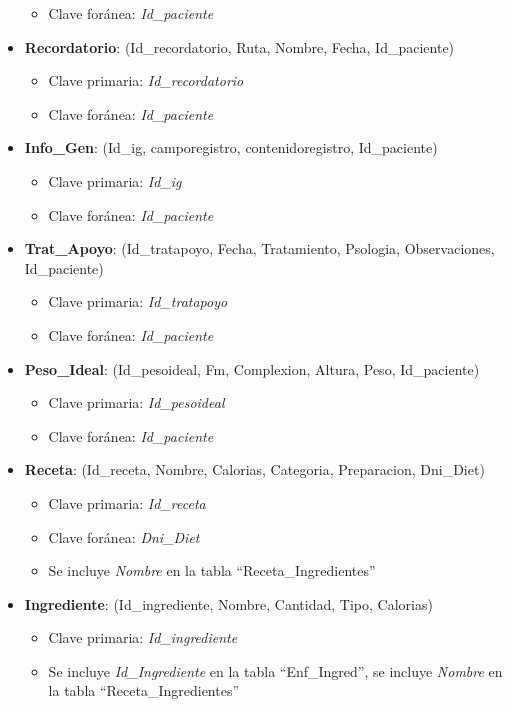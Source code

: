 \begin{itemize}
\begin{itemize}
\item Clave foránea: \textit{Id\_paciente}
\end{itemize}
\item \textbf{Recordatorio}: (Id\_recordatorio, Ruta, Nombre, Fecha, Id\_paciente)
\begin{itemize}
\item Clave primaria: \textit{Id\_recordatorio}
\item Clave foránea: \textit{Id\_paciente}
\end{itemize}
\item \textbf{Info\_Gen}: (Id\_ig, camporegistro, contenidoregistro, Id\_paciente)
\begin{itemize}
\item Clave primaria: \textit{Id\_ig}
\item Clave foránea: \textit{Id\_paciente}
\end{itemize}
\item \textbf{Trat\_Apoyo}: (Id\_tratapoyo, Fecha, Tratamiento, Psologia, Observaciones, Id\_paciente)
\begin{itemize}
\item Clave primaria: \textit{Id\_tratapoyo}
\item Clave foránea: \textit{Id\_paciente}
\end{itemize}
\item \textbf{Peso\_Ideal}: (Id\_pesoideal, Fm, Complexion, Altura, Peso, Id\_paciente)
\begin{itemize}
\item Clave primaria: \textit{Id\_pesoideal}
\item Clave foránea: \textit{Id\_paciente}
\end{itemize}
\item \textbf{Receta}: (Id\_receta, Nombre, Calorias, Categoria, Preparacion, Dni\_Diet)
\begin{itemize}
\item Clave primaria: \textit{Id\_receta}
\item Clave foránea: \textit{Dni\_Diet}
\item Se incluye \textit{Nombre} en la tabla ``Receta\_Ingredientes''
\end{itemize}
\item \textbf{Ingrediente}: (Id\_ingrediente, Nombre, Cantidad, Tipo, Calorias)
\begin{itemize}
\item Clave primaria: \textit{Id\_ingrediente}
\item Se incluye \textit{Id\_Ingrediente} en la tabla ``Enf\_Ingred'', se incluye \textit{Nombre} en la tabla ``Receta\_Ingredientes''

\end{itemize}
\end{itemize}
